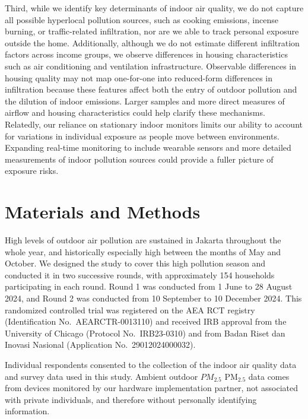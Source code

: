 \documentclass[reqno,12pt,notitlepage]{article}
\providecommand{\DIFadd}[1]{{\protect\color{BLUE}#1}} %
\providecommand{\DIFdel}[1]{{\protect\color{red}\sout{#1}}} %
\providecommand{\DIFaddbegin}{} %
\providecommand{\DIFaddend}{} %
\providecommand{\DIFdelbegin}{} %
\providecommand{\DIFdelend}{} %
\begin{document}
\DIFadd{Third, }\DIFaddend while we identify key determinants of indoor air quality, we do not capture all possible hyperlocal pollution sources, such as cooking emissions, incense burning, or traffic-related infiltration, nor are we able to track personal exposure outside the home. 
\DIFaddbegin \DIFadd{Additionally, although we do not estimate different infiltration factors across income groups, we observe differences in housing characteristics such as air conditioning and ventilation infrastructure. Observable differences in housing quality may not map one-for-one into reduced-form differences in infiltration because these features affect both the entry of outdoor pollution and the dilution of indoor emissions. Larger samples and more direct measures of airflow and housing characteristics could help clarify these mechanisms.
}\DIFaddend Relatedly, our reliance on stationary indoor monitors limits our ability to account for variations in individual exposure as people move between environments. Expanding real-time monitoring to include wearable sensors and more detailed measurements of indoor pollution sources could provide a fuller picture of exposure risks.


\section{Materials and Methods} \label{sec:methods}

High levels of outdoor air pollution are sustained in Jakarta throughout the whole year, and historically especially high between the months of May and October. We designed the study to cover this high pollution season and conducted it in two successive rounds, with approximately 154 households participating in each round. Round 1 was conducted from 1 June to 28 August 2024, and Round 2 was conducted from 10 September to 10 December 2024. This randomized controlled trial was registered on the AEA RCT registry (Identification No.\ AEARCTR-0013110) and received IRB approval from the University of Chicago (Protocol No.\ IRB23-0310) and from Badan Riset dan Inovasi Nasional (Application No.\ 29012024000032).

Individual respondents consented to the collection of the indoor air quality data and survey data used in this study. Ambient outdoor \DIFdelbegin \DIFdel{$PM_{2.5}$ }\DIFdelend \DIFaddbegin \DIFadd{PM$_{2.5}$ }\DIFaddend data comes from devices monitored by our hardware implementation partner, not associated with private individuals, and therefore without personally identifying information.
\end{document}

